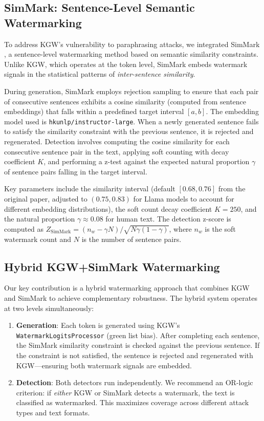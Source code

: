 \documentclass[12pt,letterpaper]{article}
\begin{document}
\subsection{SimMark: Sentence-Level Semantic Watermarking}

To address KGW's vulnerability to paraphrasing attacks, we integrated SimMark \cite{simmark2025}, a sentence-level watermarking method based on semantic similarity constraints. Unlike KGW, which operates at the token level, SimMark embeds watermark signals in the statistical patterns of \textit{inter-sentence similarity}.

During generation, SimMark employs rejection sampling to ensure that each pair of consecutive sentences exhibits a cosine similarity (computed from sentence embeddings) that falls within a predefined target interval $[a, b]$. The embedding model used is \texttt{hkunlp/instructor-large}. When a newly generated sentence fails to satisfy the similarity constraint with the previous sentence, it is rejected and regenerated. Detection involves computing the cosine similarity for each consecutive sentence pair in the text, applying soft counting with decay coefficient $K$, and performing a z-test against the expected natural proportion $\gamma$ of sentence pairs falling in the target interval.

Key parameters include the similarity interval (default $[0.68, 0.76]$ from the original paper, adjusted to $(0.75, 0.83)$ for Llama models to account for different embedding distributions), the soft count decay coefficient $K = 250$, and the natural proportion $\gamma \approx 0.08$ for human text. The detection z-score is computed as $Z_{\text{SimMark}} = (n_w - \gamma N) / \sqrt{N\gamma(1-\gamma)}$, where $n_w$ is the soft watermark count and $N$ is the number of sentence pairs.

\subsection{Hybrid KGW+SimMark Watermarking}

Our key contribution is a hybrid watermarking approach that combines KGW and SimMark to achieve complementary robustness. The hybrid system operates at two levels simultaneously:

\begin{enumerate}
    \item \textbf{Generation}: Each token is generated using KGW's \texttt{WatermarkLogitsProcessor} (green list bias). After completing each sentence, the SimMark similarity constraint is checked against the previous sentence. If the constraint is not satisfied, the sentence is rejected and regenerated with KGW---ensuring both watermark signals are embedded.
    \item \textbf{Detection}: Both detectors run independently. We recommend an OR-logic criterion: if \textit{either} KGW or SimMark detects a watermark, the text is classified as watermarked. This maximizes coverage across different attack types and text formats.
\end{enumerate}
\end{document}
